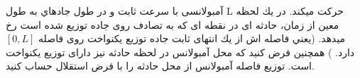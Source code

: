 \problem{}
آمبولانسی با سرعت ثابت و در طول جادهاي به طول L حركت ميكند. در يك لحظه معين از زمان، حادثه ای در نقطه ای كه به تصادف روی جاده توزيع شده است رخ ميدهد.
(يعني
فاصله اش از يك انتهای ثابت جاده توزيع يكنواخت روی فاصله $[0 ,L]$ دارد.
)
 همچنين فرض كنيد كه محل آمبولانس در لحظه حادثه نيز دارای توزيع يكنواخت است.
توزيع فاصله آمبولانس
از محل حادثه را با فرض استقلال حساب كنيد.